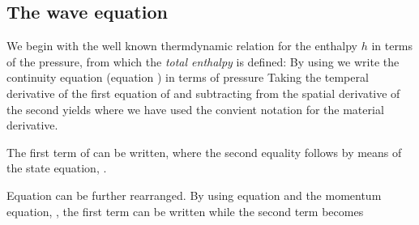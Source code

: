 \subsection{The wave equation}
We begin with the well known thermdynamic relation for the enthalpy $h$ in terms of the pressure,
from which the {\em total enthalpy} is defined:
By using  we write the continuity equation (equation \eqnref{}) in terms of pressure
Taking the temperal derivative of the first equation of  and subtracting from the spatial derivative of the second yields
where we have used the convient notation
for the material derivative.


The first term of  can be written,
where the second equality follows by means of the state equation, .

Equation  can be further rearranged.
By using equation  and the momentum equation, \eqnref{}, the first term can be written
while the second term becomes

